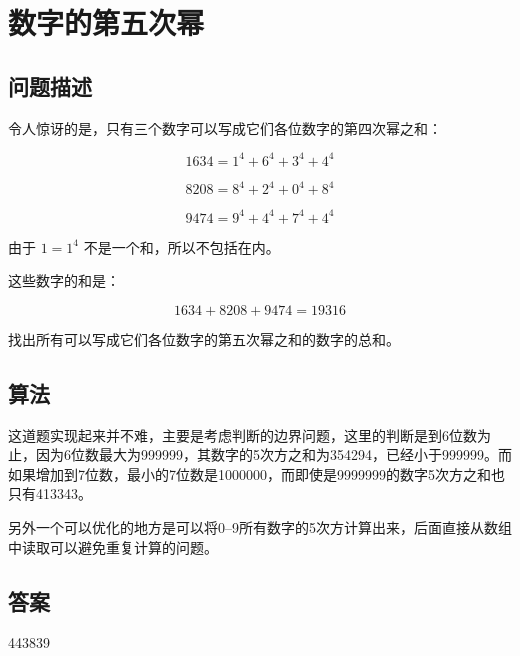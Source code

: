\section{数字的第五次幂}
\subsection{问题描述}
\begin{tcolorbox}

令人惊讶的是，只有三个数字可以写成它们各位数字的第四次幂之和：

\[
1634 = 1^4 + 6^4 + 3^4 + 4^4
\]

\[
8208 = 8^4 + 2^4 + 0^4 + 8^4
\]

\[
9474 = 9^4 + 4^4 + 7^4 + 4^4
\]

由于 $1 = 1^4$ 不是一个和，所以不包括在内。

这些数字的和是：

\[
1634 + 8208 + 9474 = 19316
\]

找出所有可以写成它们各位数字的第五次幂之和的数字的总和。
\end{tcolorbox}

\subsection{算法}
这道题实现起来并不难，主要是考虑判断的边界问题，这里的判断是到6位数为止，因为6位数最大为\num{999999}，其数字的5次方之和为\num{354294}，已经小于\num{999999}。而如果增加到7位数，最小的7位数是\num{1000000}，而即使是\num{9999999}的数字5次方之和也只有\num{413343}。

另外一个可以优化的地方是可以将0--9所有数字的5次方计算出来，后面直接从数组中读取可以避免重复计算的问题。

\subsection{答案}
443839
